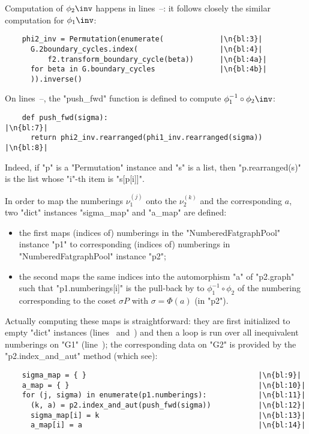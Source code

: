Computation of $\phi_2\inv$ happens in lines~--:
it follows closely the similar computation for $\phi_1\inv$:
\begin{lstlisting}
    phi2_inv = Permutation(enumerate(             |\n{bl:3}|
      G.2boundary_cycles.index(                   |\n{bl:4}|
          f2.transform_boundary_cycle(beta))      |\n{bl:4a}|
      for beta in G.boundary_cycles               |\n{bl:4b}|
      )).inverse()

\end{lstlisting}

On lines~--, the "push_fwd" function is defined to
compute $\phi_1^{-1} \circ \phi_2\inv$:
\begin{lstlisting}
    def push_fwd(sigma):                                     |\n{bl:7}|
      return phi2_inv.rearranged(phi1_inv.rearranged(sigma)) |\n{bl:8}|
\end{lstlisting}
Indeed, if "p" is a "Permutation" instance and "s" is a list, then
"p.rearranged(s)" is the list whose "i"-th item is "s[p[i]]".

In order to map the numberings $\nu_1^{(j)}$ onto the $\nu_2^{(k)}$
and the corresponding $a$, two "dict" instances "sigma_map" and
"a_map" are defined:
\begin{itemize}
\item the first maps (indices of) numberings in the
  "NumberedFatgraphPool" instance "p1" to corresponding
  (indices of) numberings in "NumberedFatgraphPool"
  instance "p2";
\item the second maps the same indices into the automorphism "a" of
  "p2.graph" such that "p1.numberings[i]" is the pull-back by
  to $\phi_1^{-1} \circ \phi_2$ of the numbering corresponding to the
  coset $\sigma P$ with $\sigma = \Phi(a)$ (in "p2").
\end{itemize}
Actually computing these maps is straightforward: they are first
initialized to empty "dict" instances (lines~ and~)
and then a loop is run over all inequivalent numberings on "G1"
(line~);  the corresponding data on "G2" is provided by the
"p2.index_and_aut" method (which see):
\begin{lstlisting}
    sigma_map = { }                                        |\n{bl:9}|
    a_map = { }                                            |\n{bl:10}|
    for (j, sigma) in enumerate(p1.numberings):            |\n{bl:11}|
      (k, a) = p2.index_and_aut(push_fwd(sigma))           |\n{bl:12}|
      sigma_map[i] = k                                     |\n{bl:13}|
      a_map[i] = a                                         |\n{bl:14}|

\end{lstlisting}

